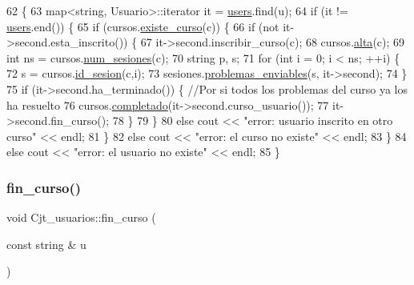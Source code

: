 \begin{DoxyCode}
62                                                                                                            
      \{
63         map<string, Usuario>::iterator it = \mbox{\hyperlink{class_cjt__usuarios_a0b702ca0184d6fb2674cc827d39d5bff}{users}}.find(u);
64         \textcolor{keywordflow}{if} (it != \mbox{\hyperlink{class_cjt__usuarios_a0b702ca0184d6fb2674cc827d39d5bff}{users}}.end()) \{
65           \textcolor{keywordflow}{if} (cursos.\mbox{\hyperlink{class_cjt__cursos_aed873ef8285d1f33c391bd4d808185de}{existe\_curso}}(c)) \{
66             \textcolor{keywordflow}{if} (not it->second.esta\_inscrito()) \{
67               it->second.inscribir\_curso(c);
68               cursos.\mbox{\hyperlink{class_cjt__cursos_a974c8ac07471f9354fb13616a489f726}{alta}}(c);
69               \textcolor{keywordtype}{int} ns = cursos.\mbox{\hyperlink{class_cjt__cursos_a3a8c9c5eecbdab5e1702233dab4d725b}{num\_sesiones}}(c);
70               \textcolor{keywordtype}{string} p, s;
71               \textcolor{keywordflow}{for} (\textcolor{keywordtype}{int} i = 0; i < ns; ++i) \{
72                 s = cursos.\mbox{\hyperlink{class_cjt__cursos_acbc9b738ae2d1ba8ba2633aa57561fcb}{id\_sesion}}(c,i);
73                 sesiones.\mbox{\hyperlink{class_cjt__sesiones_a52b36f12479444065510c1acfb235dfe}{problemas\_enviables}}(s, it->second);
74               \}
75               \textcolor{keywordflow}{if} (it->second.ha\_terminado()) \{ \textcolor{comment}{//Por si todos los problemas del curso ya los ha resuelto}
76                 cursos.\mbox{\hyperlink{class_cjt__cursos_a140c61d43f549aa71503f5b8b080c48c}{completado}}(it->second.curso\_usuario());
77                 it->second.fin\_curso();
78               \}
79             \}
80             \textcolor{keywordflow}{else} cout << \textcolor{stringliteral}{"error: usuario inscrito en otro curso"} << endl;
81           \}
82           \textcolor{keywordflow}{else} cout << \textcolor{stringliteral}{"error: el curso no existe"} << endl;
83         \}
84         \textcolor{keywordflow}{else} cout << \textcolor{stringliteral}{"error: el usuario no existe"} << endl;
85       \}
\end{DoxyCode}
\mbox{\label{class_cjt__usuarios_a7acb700ca2630c820cbc4d639d8c42de}} 
\subsubsection{\texorpdfstring{fin\+\_\+curso()}{fin\_curso()}}
{\footnotesize\ttfamily void Cjt\+\_\+usuarios\+::fin\+\_\+curso (\begin{DoxyParamCaption}\item[{const string \&}]{u }\end{DoxyParamCaption})}



